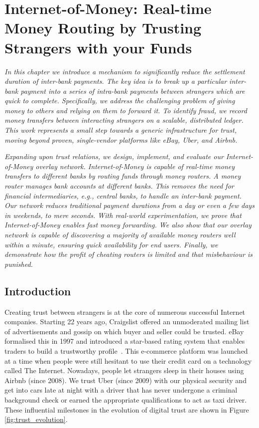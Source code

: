 \chapter{Internet-of-Money: Real-time Money Routing by Trusting Strangers with your Funds}
\label{chapter:iom}

\emph{In this chapter we introduce a mechanism to significantly reduce the settlement duration of inter-bank payments.
The key idea is to break up a particular inter-bank payment into a series of intra-bank payments between strangers which are quick to complete.
Specifically, we address the challenging problem of giving money to others and relying on them to forward it.
To identify fraud, we record money transfers between interacting strangers on a scalable, distributed ledger.
This work represents a small step towards a generic infrastructure for trust, moving beyond proven, single-vendor platforms like eBay, Uber, and Airbnb.}

\emph{Expanding upon trust relations, we design, implement, and evaluate our Internet-of-Money overlay network.
Internet-of-Money is capable of real-time money transfers to different banks by routing funds through \emph{money routers}.
A money router manages bank accounts at different banks.
This removes the need for financial intermediaries, e.g., central banks, to handle an inter-bank payment.
Our network reduces traditional payment durations from a day or even a few days in weekends, to mere seconds.
With real-world experimentation, we prove that Internet-of-Money enables fast money forwarding.
We also show that our overlay network is capable of discovering a majority of available money routers well within a minute, ensuring quick availability for end users.
Finally, we demonstrate how the profit of cheating routers is limited and that misbehaviour is punished.}

\newpage

\section{Introduction}
Creating trust between strangers is at the core of numerous successful Internet companies.
Starting 22 years ago, Craigslist offered an unmoderated mailing list of advertisements and gossip on which buyer and seller could be trusted.
eBay formalised this in 1997 and introduced a star-based rating system that enables traders to build a trustworthy profile~\cite{resnick2002trust}.
This e-commerce platform was launched at a time when people were still hesitant to use their credit card on a technology called The Internet.
Nowadays, people let strangers sleep in their houses using Airbnb (since 2008).
We trust Uber (since 2009) with our physical security and get into cars late at night with a driver that has never undergone a criminal background check or earned the appropriate qualifications to act as taxi driver.
These influential milestones in the evolution of digital trust are shown in Figure \ref{fig:trust_evolution}.

